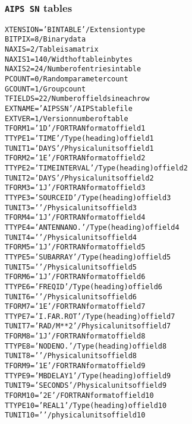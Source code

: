\documentclass[twoside]{article}
\begin{document}
\subsubsection{{\tt AIPS SN} tables}
\label{Appe:SNtable}
\begin{alltt}
XTENSION= 'BINTABLE'           / Extension type
BITPIX  =                    8 / Binary data
NAXIS   =                    2 / Table is a matrix
NAXIS1  =                  140 / Width of table in bytes
NAXIS2  =                   24 / Number of entries in table
PCOUNT  =                    0 / Random parameter count
GCOUNT  =                    1 / Group count
TFIELDS =                   22 / Number of fields in each row
EXTNAME = 'AIPS SN '           / AIPS table file
EXTVER  =                    1 / Version number of table
TFORM1  = '1D      '           / FORTRAN format of field  1
TTYPE1  = 'TIME            '   / Type (heading) of field  1
TUNIT1  = 'DAYS    '           / Physical units of field  1
TFORM2  = '1E      '           / FORTRAN format of field  2
TTYPE2  = 'TIME INTERVAL   '   / Type (heading) of field  2
TUNIT2  = 'DAYS    '           / Physical units of field  2
TFORM3  = '1J      '           / FORTRAN format of field  3
TTYPE3  = 'SOURCE ID       '   / Type (heading) of field  3
TUNIT3  = '        '           / Physical units of field  3
TFORM4  = '1J      '           / FORTRAN format of field  4
TTYPE4  = 'ANTENNA NO.     '   / Type (heading) of field  4
TUNIT4  = '        '           / Physical units of field  4
TFORM5  = '1J      '           / FORTRAN format of field  5
TTYPE5  = 'SUBARRAY        '   / Type (heading) of field  5
TUNIT5  = '        '           / Physical units of field  5
TFORM6  = '1J      '           / FORTRAN format of field  6
TTYPE6  = 'FREQ ID         '   / Type (heading) of field  6
TUNIT6  = '        '           / Physical units of field  6
TFORM7  = '1E      '           / FORTRAN format of field  7
TTYPE7  = 'I.FAR.ROT       '   / Type (heading) of field  7
TUNIT7  = 'RAD/M**2'           / Physical units of field  7
TFORM8  = '1J      '           / FORTRAN format of field  8
TTYPE8  = 'NODE NO.        '   / Type (heading) of field  8
TUNIT8  = '        '           / Physical units of field  8
TFORM9  = '1E      '           / FORTRAN format of field  9
TTYPE9  = 'MBDELAY1        '   / Type (heading) of field  9
TUNIT9  = 'SECONDS '           / Physical units of field  9
TFORM10 = '2E      '           / FORTRAN format of field 10
TTYPE10 = 'REAL1           '   / Type (heading) of field 10
TUNIT10 = '        '           / physical units of field 10

\end{alltt}
\end{document}
